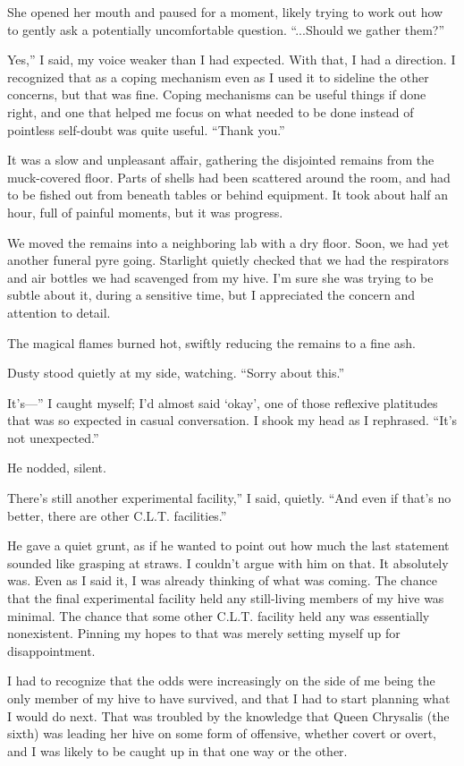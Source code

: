 She opened her mouth and paused for a moment, likely trying to work out how to gently ask a potentially uncomfortable question. “...Should we gather them?”

\leavevmode{}Yes,” I said, my voice weaker than I had expected. With that, I had a direction. I recognized that as a coping mechanism even as I used it to sideline the other concerns, but that was fine. Coping mechanisms can be useful things if done right, and one that helped me focus on what needed to be done instead of pointless self-doubt was quite useful. “Thank you.”

It was a slow and unpleasant affair, gathering the disjointed remains from the muck-covered floor. Parts of shells had been scattered around the room, and had to be fished out from beneath tables or behind equipment. It took about half an hour, full of painful moments, but it was progress.

We moved the remains into a neighboring lab with a dry floor. Soon, we had yet another funeral pyre going. Starlight quietly checked that we had the respirators and air bottles we had scavenged from my hive. I’m sure she was trying to be subtle about it, during a sensitive time, but I appreciated the concern and attention to detail.

The magical flames burned hot, swiftly reducing the remains to a fine ash.

Dusty stood quietly at my side, watching. “Sorry about this.”

\leavevmode{}It’s—” I caught myself; I’d almost said ‘okay’, one of those reflexive platitudes that was so expected in casual conversation. I shook my head as I rephrased. “It’s not unexpected.”

He nodded, silent.

\leavevmode{}There’s still another experimental facility,” I said, quietly. “And even if that’s no better, there are other C.L.T. facilities.”

He gave a quiet grunt, as if he wanted to point out how much the last statement sounded like grasping at straws. I couldn’t argue with him on that. It absolutely was. Even as I said it, I was already thinking of what was coming. The chance that the final experimental facility held any still-living members of my hive was minimal. The chance that some other C.L.T. facility held any was essentially nonexistent. Pinning my hopes to that was merely setting myself up for disappointment.

I had to recognize that the odds were increasingly on the side of me being the only member of my hive to have survived, and that I had to start planning what I would do next. That was troubled by the knowledge that Queen Chrysalis (the sixth) was leading her hive on some form of offensive, whether covert or overt, and I was likely to be caught up in that one way or the other.

